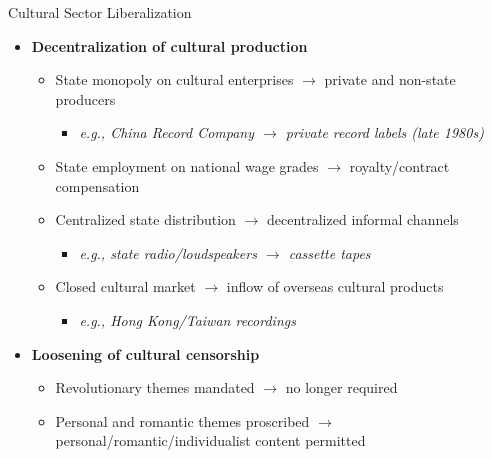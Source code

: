 \documentclass[aspectratio=169]{beamer}
\begin{document}
\begin{frame}{Cultural Sector Liberalization}

\small
\begin{itemize}\setlength\itemsep{0.6em}
  \item \textbf{Decentralization of cultural production}
  \begin{itemize}\setlength\itemsep{0.3em}
    \item State monopoly on cultural enterprises $\rightarrow$ private and non-state producers
    \begin{itemize}
      \item \textit{e.g., China Record Company $\rightarrow$ private record labels (late 1980s)}
    \end{itemize}
    \item State employment on national wage grades $\rightarrow$ royalty/contract compensation
    \item Centralized state distribution $\rightarrow$ decentralized informal channels
    \begin{itemize}
      \item \textit{e.g., state radio/loudspeakers $\rightarrow$ cassette tapes}
    \end{itemize}
    \item Closed cultural market $\rightarrow$ inflow of overseas cultural products
    \begin{itemize}
      \item \textit{e.g., Hong Kong/Taiwan recordings}
    \end{itemize}
  \end{itemize}

  \item \textbf{Loosening of cultural censorship}
  \begin{itemize}\setlength\itemsep{0.3em}
    \item Revolutionary themes mandated $\rightarrow$ no longer required
    \item Personal and romantic themes proscribed $\rightarrow$ personal/romantic/individualist content permitted
  \end{itemize}
\end{itemize}

\end{frame}
\end{document}
